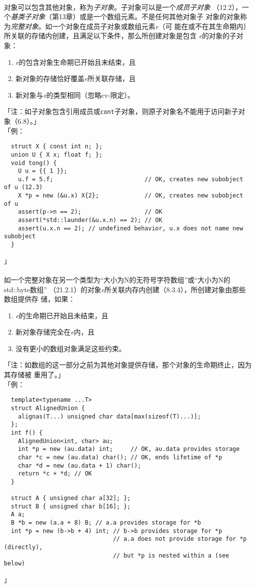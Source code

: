 \paragraph{}
对象可以包含其他对象，称为\textit{子对象}。子对象可以是一个\textit{成员子对象}
（12.2），一个\textit{基类子对象}（第13章）或是一个数组元素。不是任何其他对象子
对象的对象称为\textit{完整对象}。如一个对象在成员子对象或数组元素\textit{e}（可
能在或不在其生命期内）所关联的存储内创建，且满足以下条件，那么所创建对象是包含
\textit{e}的对象的子对象：
\begin{enumerate}
  \item \textit{e}的包含对象生命期已开始且未结束，且
  \item 新对象的存储恰好覆盖\textit{e}所关联存储，且
  \item 新对象与\textit{e}的类型相同（忽略cv-限定）。
\end{enumerate}
「注：如子对象包含引用成员或\texttt{cont}子对象，则原子对象名不能用于访问新子对
象（6.8）。」 \\
「例：
\begin{lstlisting}
  struct X { const int n; };
  union U { X x; float f; };
  void tong() {
    U u = {{ 1 }};
    u.f = 5.f;                          // OK, creates new subobject of u (12.3)
    X *p = new (&u.x) X{2};             // OK, creates new subobject of u
    assert(p->n == 2);                  // OK
    assert(*std::launder(&u.x.n) == 2); // OK
    assert(u.x.n == 2); // undefined behavior, u.x does not name new subobject
  }
\end{lstlisting}
」

\paragraph{}
如一个完整对象在另一个类型为“大小为N的无符号字符数组”或“大小为N的std::byte数组”
（21.2.1）的对象\textit{e}所关联内存内创建（8.3.4），所创建对象由那些数组提供存
储，如果：
\begin{enumerate}
  \item \textit{e}的生命期已开始且未结束，且
  \item 新对象存储完全在\textit{e}内，且
  \item 没有更小的数组对象满足这些约束。
\end{enumerate}
「注：如数组的这一部分之前为其他对象提供存储，那个对象的生命期终止，因为其存储被
重用了。」 \\
「例：
\begin{lstlisting}
  template<typename ...T>
  struct AlignedUnion {
    alignas(T...) unsigned char data[max(sizeof(T)...)];
  };
  int f() {
    AlignedUnion<int, char> au;
    int *p = new (au.data) int;     // OK, au.data provides storage
    char *c = new (au.data) char(); // OK, ends lifetime of *p
    char *d = new (au.data + 1) char();
    return *c + *d; // OK
  }

  struct A { unsigned char a[32]; };
  struct B { unsigned char b[16]; };
  A a;
  B *b = new (a.a + 8) B; // a.a provides storage for *b
  int *p = new (b->b + 4) int; // b->b provides storage for *p
                               // a.a does not provide storage for *p (directly),
                               // but *p is nested within a (see below)
\end{lstlisting}
」

